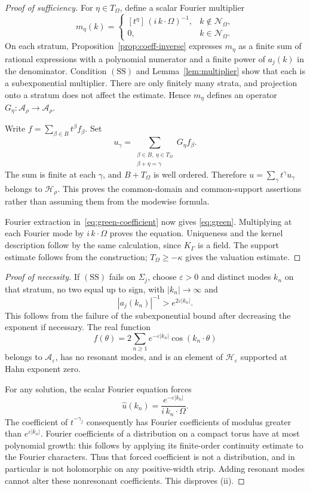 \documentclass[11pt,letterpaper]{article}
\theoremstyle{definition}
\theoremstyle{remark}
\newcommand{\A}{\mathcal A}
\newcommand{\HH}{\mathcal H}
\newcommand{\res}{\mathcal N_{\Omega}}
\newcommand{\SDcond}{\mathrm{SS}}
\newcommand{\coef}[2]{[t^{#1}]\,#2}
\newcommand{\eps}{\varepsilon}
\numberwithin{equation}{section}
\begin{document}
\begin{proof}[Proof of sufficiency]
For $\eta\in T_\Omega$, define a scalar Fourier multiplier
\[
 m_\eta(k)=
 \begin{cases}
 \coef{\eta}{(i\,k\cdot\Omega)^{-1}},&k\notin\res,\\
 0,&k\in\res.
 \end{cases}
\]
On each stratum, Proposition~\ref{prop:coeff-inverse} expresses $m_\eta$ as
a finite sum of rational expressions with a polynomial numerator and a
finite power of $a_j(k)$ in the denominator.  Condition $(\SDcond)$ and
Lemma~\ref{lem:multiplier} show that each is a subexponential multiplier.
There are only finitely many strata, and projection onto a stratum does not
affect the estimate.  Hence $m_\eta$ defines an operator
$G_\eta:\A_\rho\to\A_\rho$.

Write $f=\sum_{\beta\in B}t^\beta f_\beta$.  Set
\begin{equation}\label{eq:green-coefficient}
 u_\gamma=\sum_{\substack{\beta\in B,\ \eta\in T_\Omega\\
                         \beta+\eta=\gamma}}G_\eta f_\beta.
\end{equation}
The sum is finite at each $\gamma$, and $B+T_\Omega$ is well ordered.
Therefore $u=\sum_\gamma t^\gamma u_\gamma$ belongs to $\HH_\rho$.
This proves the common-domain and common-support assertions rather than
assuming them from the modewise formula.

Fourier extraction in~\eqref{eq:green-coefficient} now gives
\eqref{eq:green}.  Multiplying at each Fourier mode by $i\,k\cdot\Omega$
proves the equation.  Uniqueness and the kernel description follow by the
same calculation, since $K_\Gamma$ is a field.  The support estimate follows
from the construction; $T_\Omega\ge-\kappa$ gives the valuation estimate.
\end{proof}

\begin{proof}[Proof of necessity]
If $(\SDcond)$ fails on $\Sigma_j$, choose $\eps>0$ and distinct modes $k_n$ on
that stratum, no two equal up to sign, with $|k_n|\to\infty$ and
\[
 |a_j(k_n)|^{-1}>e^{2\eps|k_n|}.
\]
This follows from the failure of the subexponential bound after decreasing
the exponent if necessary.  The real function
\begin{equation}\label{eq:bad-forcing}
 f(\theta)=2\sum_{n\ge1}e^{-\eps|k_n|}\cos(k_n\cdot\theta)
\end{equation}
belongs to $\A_\eps$, has no resonant modes, and is an element of
$\HH_\eps$ supported at Hahn exponent zero.

For any solution, the scalar Fourier equation forces
\[
 \widehat u(k_n)=\frac{e^{-\eps|k_n|}}{i\,k_n\cdot\Omega}.
\]
The coefficient of $t^{-\gamma_j}$ consequently has Fourier coefficients
of modulus greater than $e^{\eps|k_n|}$.  Fourier coefficients of a
distribution on a compact torus have at most polynomial growth: this follows
by applying its finite-order continuity estimate to the Fourier characters.
Thus that forced coefficient is not a distribution, and in particular is
not holomorphic on any positive-width strip.  Adding resonant modes cannot
alter these nonresonant coefficients.  This disproves (ii).
\end{proof}
\end{document}
